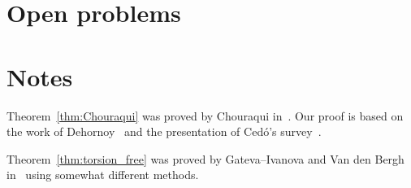\section*{Open problems}

\section*{Notes}

Theorem~\ref{thm:Chouraqui} was proved by Chouraqui in~\cite{MR2764830}. Our proof is based on the work 
of Dehornoy~\cite{MR3374524} and the presentation of Cedó's survey~\cite{MR3824447}. 

Theorem~\ref{thm:torsion_free} was proved by Gateva--Ivanova and Van den Bergh in~\cite{MR1637256} using somewhat 
different methods. 